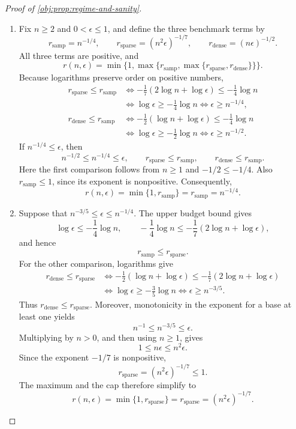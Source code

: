 \begin{proof}[Proof of \cref{obj:prop:regime-and-sanity}]
\begin{enumerate}
\item Fix \(n\ge2\) and \(0<\epsilon\le1\), and define the three benchmark terms by
\[
r_{\mathrm{samp}}=n^{-1/4},
\qquad
r_{\mathrm{sparse}}=(n^2\epsilon)^{-1/7},
\qquad
r_{\mathrm{dense}}=(n\epsilon)^{-1/2}.
\]
All three terms are positive, and
\[
r(n,\epsilon)
=\min\{1,\max\{r_{\mathrm{samp}},
                    \max\{r_{\mathrm{sparse}},r_{\mathrm{dense}}\}\}\}.
\]
Because logarithms preserve order on positive numbers,
\[
\begin{aligned}
r_{\mathrm{sparse}}\le r_{\mathrm{samp}}
&\iff
-\frac17(2\log n+\log\epsilon)\le-\frac14\log n\\
&\iff \log\epsilon\ge-\frac14\log n
\iff \epsilon\ge n^{-1/4},
\\
r_{\mathrm{dense}}\le r_{\mathrm{samp}}
&\iff
-\frac12(\log n+\log\epsilon)\le-\frac14\log n\\
&\iff \log\epsilon\ge-\frac12\log n
\iff \epsilon\ge n^{-1/2}.
\end{aligned}
\]
If \(n^{-1/4}\le\epsilon\), then
\[
n^{-1/2}\le n^{-1/4}\le\epsilon,
\qquad
r_{\mathrm{sparse}}\le r_{\mathrm{samp}},
\qquad
r_{\mathrm{dense}}\le r_{\mathrm{samp}}.
\]
Here the first comparison follows from \(n\ge1\) and
\(-1/2\le-1/4\). Also \(r_{\mathrm{samp}}\le1\), since its exponent is nonpositive. Consequently,
\[
r(n,\epsilon)
=\min\{1,r_{\mathrm{samp}}\}
=r_{\mathrm{samp}}
=n^{-1/4}.
\]

\item Suppose that \(n^{-3/5}\le\epsilon\le n^{-1/4}\).
The upper budget bound gives
\[
\log\epsilon\le-\frac14\log n,
\qquad
-\frac14\log n
\le-\frac17(2\log n+\log\epsilon),
\]
and hence
\[
r_{\mathrm{samp}}\le r_{\mathrm{sparse}}.
\]
For the other comparison, logarithms give
\[
\begin{aligned}
r_{\mathrm{dense}}\le r_{\mathrm{sparse}}
&\iff
-\frac12(\log n+\log\epsilon)
\le-\frac17(2\log n+\log\epsilon)\\
&\iff \log\epsilon\ge-\frac35\log n
\iff \epsilon\ge n^{-3/5}.
\end{aligned}
\]
Thus \(r_{\mathrm{dense}}\le r_{\mathrm{sparse}}\).
Moreover, monotonicity in the exponent for a base at least one yields
\[
n^{-1}\le n^{-3/5}\le\epsilon.
\]
Multiplying by \(n>0\), and then using \(n\ge1\), gives
\[
1\le n\epsilon\le n^2\epsilon.
\]
Since the exponent \(-1/7\) is nonpositive,
\[
r_{\mathrm{sparse}}=(n^2\epsilon)^{-1/7}\le1.
\]
The maximum and the cap therefore simplify to
\[
r(n,\epsilon)
=\min\{1,r_{\mathrm{sparse}}\}
=r_{\mathrm{sparse}}
=(n^2\epsilon)^{-1/7}.
\]


\end{enumerate}
\end{proof}
